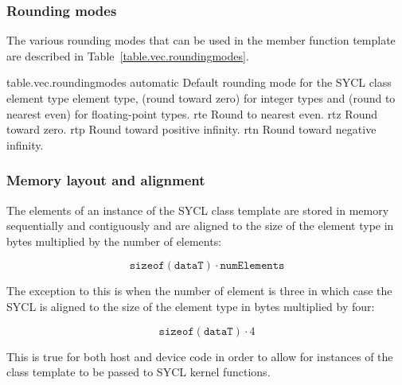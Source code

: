 \subsubsection{Rounding modes}

The various rounding modes that can be used in the  member function template are described in Table~\ref{table.vec.roundingmodes}.

{table.vec.roundingmodes}
  \addRow
    {automatic}
    {
      Default rounding mode for the SYCL  class element type element type,  (round toward zero) for integer types and  (round to nearest even) for floating-point types.
    }
  \addRow
    {rte}
    {
      Round to nearest even.
    }
  \addRow
    {rtz}
    {
      Round toward zero.
    }
  \addRow
    {rtp}
    {
      Round toward positive infinity.
    }
  \addRow
    {rtn}
    {
      Round toward negative infinity.
    }  
  \completeTable

\subsubsection{Memory layout and alignment}
\label{memory-layout-and-alignment}

The elements of an instance of the SYCL  class template are stored in memory sequentially and contiguously and are aligned to the size of the element type in bytes multiplied by the number of elements:

\begin{equation}
\label{vec-memory-alignment}
\texttt{sizeof}(\texttt{dataT}) \cdot \texttt{numElements}
\end{equation}

The exception to this is when the number of element is three in which case the SYCL  is aligned to the size of the element type in bytes multiplied by four:

\begin{equation}
\label{vec3-memory-alignment}
\texttt{sizeof}(\texttt{dataT}) \cdot 4
\end{equation}

This is true for both host and device code in order to allow for instances of the  class template to be passed to SYCL kernel functions.


